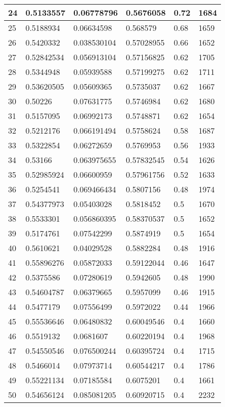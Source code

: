 \begin{longtable}{|l|l|l|l|l|l|}
24 & 0.5133557 & 0.06778796 & 0.5676058 & 0.72 & 1684 \\ \hline 
25 & 0.5188934 & 0.06634598 & 0.568579 & 0.68 & 1659 \\ \hline 
26 & 0.5420332 & 0.038530104 & 0.57028955 & 0.66 & 1652 \\ \hline 
27 & 0.52842534 & 0.056913104 & 0.57156825 & 0.62 & 1705 \\ \hline 
28 & 0.5344948 & 0.05939588 & 0.57199275 & 0.62 & 1711 \\ \hline 
29 & 0.53620505 & 0.05609365 & 0.5735037 & 0.62 & 1667 \\ \hline 
30 & 0.50226 & 0.07631775 & 0.5746984 & 0.62 & 1680 \\ \hline 
31 & 0.5157095 & 0.06992173 & 0.5748871 & 0.62 & 1654 \\ \hline 
32 & 0.5212176 & 0.066191494 & 0.5758624 & 0.58 & 1687 \\ \hline 
33 & 0.5322854 & 0.06272659 & 0.5769953 & 0.56 & 1933 \\ \hline 
34 & 0.53166 & 0.063975655 & 0.57832545 & 0.54 & 1626 \\ \hline 
35 & 0.52985924 & 0.06600959 & 0.57961756 & 0.52 & 1633 \\ \hline 
36 & 0.5254541 & 0.069466434 & 0.5807156 & 0.48 & 1974 \\ \hline 
37 & 0.54377973 & 0.05403028 & 0.5818452 & 0.5 & 1670 \\ \hline 
38 & 0.5533301 & 0.056860395 & 0.58370537 & 0.5 & 1652 \\ \hline 
39 & 0.5174761 & 0.07542299 & 0.5874919 & 0.5 & 1654 \\ \hline 
40 & 0.5610621 & 0.04029528 & 0.5882284 & 0.48 & 1916 \\ \hline 
41 & 0.55896276 & 0.05872033 & 0.59122044 & 0.46 & 1647 \\ \hline 
42 & 0.5375586 & 0.07280619 & 0.5942605 & 0.48 & 1990 \\ \hline 
43 & 0.54604787 & 0.06379665 & 0.5957099 & 0.46 & 1915 \\ \hline 
44 & 0.5477179 & 0.07556499 & 0.5972022 & 0.44 & 1966 \\ \hline 
45 & 0.55536646 & 0.06480832 & 0.60049546 & 0.4 & 1660 \\ \hline 
46 & 0.5519132 & 0.0681607 & 0.60220194 & 0.4 & 1968 \\ \hline 
47 & 0.54550546 & 0.076500244 & 0.60395724 & 0.4 & 1715 \\ \hline 
48 & 0.5466014 & 0.07973714 & 0.60544217 & 0.4 & 1786 \\ \hline 
49 & 0.55221134 & 0.07185584 & 0.6075201 & 0.4 & 1661 \\ \hline 
50 & 0.54656124 & 0.085081205 & 0.60920715 & 0.4 & 2232 \\ \hline 
\end{longtable}